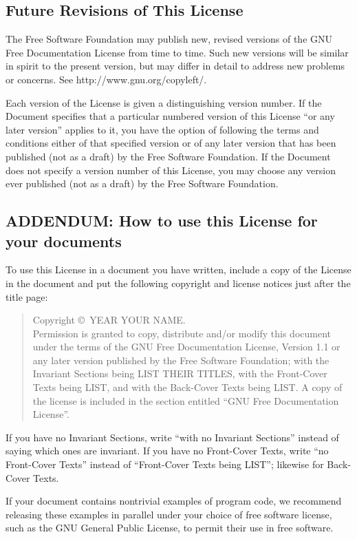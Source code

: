 \documentclass[11pt,a4paper,oneside]{alb-corp}
\begin{document}
\subsection{Future Revisions of This License}
\label{sec:gnu-free-doc-license:future-revis-this-license}

The Free Software Foundation may publish new, revised versions of the
GNU Free Documentation License from time to time.  Such new versions
will be similar in spirit to the present version, but may differ in
detail to address new problems or concerns. See
http://www.gnu.org/copyleft/.

Each version of the License is given a distinguishing version number.
If the Document specifies that a particular numbered version of this
License ``or any later version'' applies to it, you have the option of
following the terms and conditions either of that specified version or
of any later version that has been published (not as a draft) by the
Free Software Foundation.  If the Document does not specify a version
number of this License, you may choose any version ever published (not
as a draft) by the Free Software Foundation.


\subsection*{ADDENDUM: How to use this License for your documents}

To use this License in a document you have written, include a copy of
the License in the document and put the following copyright and license
notices just after the title page:

\begin{quote}
  Copyright \copyright\ YEAR YOUR NAME.\\
  Permission is granted to copy, distribute and/or modify this document
  under the terms of the GNU Free Documentation License, Version 1.1 or
  any later version published by the Free Software Foundation; with the
  Invariant Sections being LIST THEIR TITLES, with the Front-Cover Texts
  being LIST, and with the Back-Cover Texts being LIST.  A copy of the
  license is included in the section entitled ``GNU Free Documentation
  License''.
\end{quote}

If you have no Invariant Sections, write ``with no Invariant Sections''
instead of saying which ones are invariant.  If you have no Front-Cover
Texts, write ``no Front-Cover Texts'' instead of ``Front-Cover Texts
being LIST''; likewise for Back-Cover Texts.

If your document contains nontrivial examples of program code, we
recommend releasing these examples in parallel under your choice of free
software license, such as the GNU General Public License, to permit
their use in free software.
\end{document}

